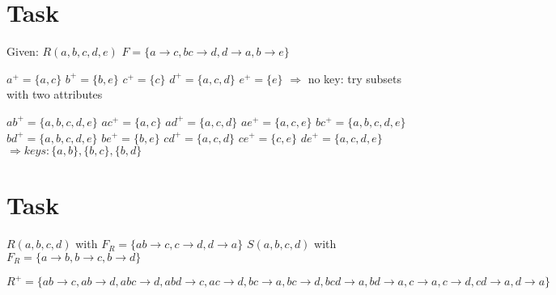 \documentclass{article}
\begin{document}
\section{Task}
\par Given: \newline
$R(a, b, c, d, e)$ \newline
$F = \{  
        a \rightarrow c,
        bc \rightarrow d,
        d \rightarrow a,
        b \rightarrow e
    \}$
\par
$a^{+} = \{a, c \}$ \newline
$b^{+} = \{b, e \}$ \newline
$c^{+} = \{c \}$ \newline
$d^{+} = \{a, c, d \}$ \newline
$e^{+} = \{e \}$ \newline
$\Rightarrow$ no key: try subsets with two attributes

\par
$ab^{+} = \{a, b, c, d, e \}$ \newline
$ac^{+} = \{a, c \}$ \newline
$ad^{+} = \{a, c, d \}$ \newline
$ae^{+} = \{a, c, e \}$ \newline
$bc^{+} = \{a, b, c, d, e \}$ \newline
$bd^{+} = \{a, b, c, d, e \}$ \newline
$be^{+} = \{b, e \}$ \newline
$cd^{+} = \{a, c, d \}$ \newline
$ce^{+} = \{c, e \}$ \newline
$de^{+} = \{a, c, d, e \}$ \newline
$\Rightarrow keys: \{a, b\}, \{b, c\}, \{b, d\}$ 

\section{Task}
$R(a, b, c, d)$ with $F_{R} = \{ ab \rightarrow c, c \rightarrow d, d \rightarrow a \}$ \newline
$S(a, b, c, d)$ with $F_{R} = \{ a \rightarrow b, b \rightarrow c, b \rightarrow d \}$

$R^{+} = \{ 
            ab \rightarrow c, 
            ab \rightarrow d,
            abc \rightarrow d,
            abd \rightarrow c,
            ac \rightarrow d,
            bc \rightarrow a,
            bc \rightarrow d,
            bcd \rightarrow a,
            bd \rightarrow a,
            c \rightarrow a,
            c \rightarrow d, 
            cd \rightarrow a,
            d \rightarrow a 
        \}$
\end{document}
